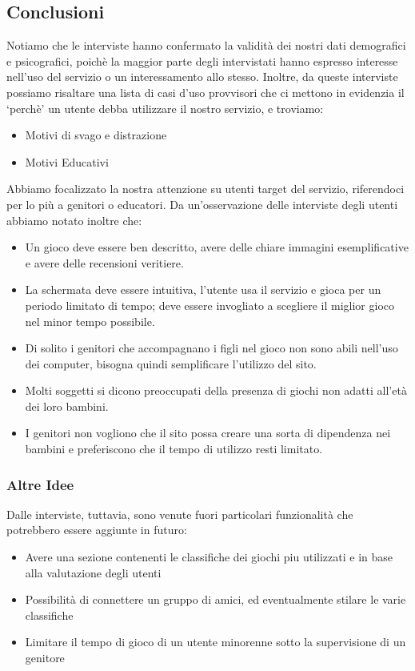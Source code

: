 \documentclass[../Report.tex]{subfiles}
\begin{document}
    \newpage
    \subsection{Conclusioni}

    Notiamo che le interviste hanno confermato la validità dei nostri dati demografici e psicografici, poichè la maggior parte  degli intervistati hanno espresso interesse nell’uso del servizio o un interessamento allo stesso.
    Inoltre, da queste interviste possiamo risaltare una lista di casi d’uso provvisori che ci mettono in evidenzia il ‘perchè’ un utente debba utilizzare il nostro servizio, e troviamo:
    \begin{itemize}
        \item Motivi di svago e distrazione
        \item Motivi Educativi
    \end{itemize}
    Abbiamo focalizzato la nostra attenzione su utenti target del servizio, riferendoci per lo più a genitori o educatori. 
    Da un’osservazione delle interviste degli utenti abbiamo notato inoltre che:
    \begin{itemize}
        \item Un gioco deve essere ben descritto, avere delle chiare immagini esemplificative e avere delle recensioni veritiere.
        \item La schermata deve essere intuitiva, l’utente usa il servizio e gioca per un periodo limitato di tempo; deve essere invogliato a scegliere il miglior gioco nel minor tempo possibile.
        \item Di solito i genitori che accompagnano i figli nel gioco non sono abili nell’uso dei computer, bisogna quindi semplificare l'utilizzo del sito. 
        \item Molti soggetti si dicono preoccupati della presenza di giochi non adatti all'età dei loro bambini. 
        \item I genitori non vogliono che il sito possa creare una sorta di dipendenza nei bambini e preferiscono che il tempo di utilizzo resti limitato. 
    \end{itemize}
    

    \subsubsection*{Altre Idee}
    Dalle interviste, tuttavia, sono venute fuori particolari funzionalità che potrebbero essere aggiunte in futuro:
    \begin{itemize}
        \item Avere una sezione contenenti le classifiche dei giochi piu utilizzati e in base alla valutazione degli utenti
        \item Possibilità di connettere un gruppo di amici, ed eventualmente stilare le varie classifiche 
        \item Limitare il tempo di gioco di un utente minorenne sotto la supervisione di un genitore
        
    \end{itemize}
\end{document}
